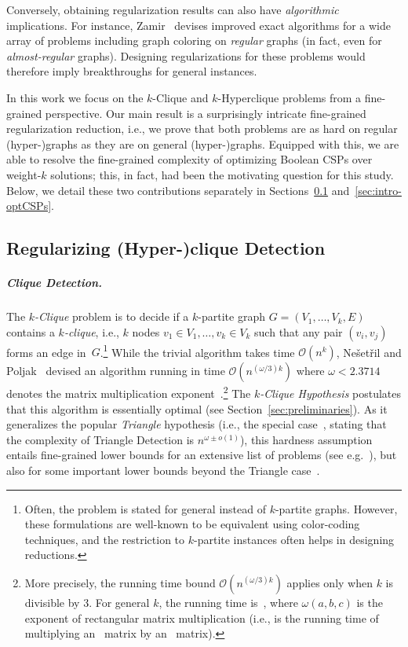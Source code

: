 \documentclass[a4paper,UKenglish,cleveref, autoref, thm-restate,numberwithinsect]{lipics-v2021}
\newcommand{\bigO}{\mathcal{O}}
\begin{document}
Conversely, obtaining regularization results can also have \emph{algorithmic} implications. For instance, Zamir~\cite{Zamir23} devises improved exact algorithms for a wide array of problems including graph coloring on \emph{regular} graphs (in fact, even for \emph{almost-regular} graphs). Designing regularizations for these problems would therefore imply breakthroughs for general instances.

In this work we focus on the $k$-Clique and $k$-Hyperclique problems from a fine-grained perspective. Our main result is a surprisingly intricate fine-grained regularization reduction, i.e., we prove that both problems are as hard on regular (hyper-)graphs as they are on general (hyper-)graphs. Equipped with this, we are able to resolve the fine-grained complexity of optimizing Boolean CSPs over weight-$k$ solutions; this, in fact, had been the motivating question for this study. Below, we detail these two contributions separately in Sections~\ref{sec:intro-hyperclique} and~\ref{sec:intro-optCSPs}. 

\subsection{Regularizing (Hyper-)clique Detection}
\label{sec:intro-hyperclique}
\subparagraph*{Clique Detection.}
The \emph{$k$-Clique} problem is to decide if a $k$-partite graph $G = (V_1, \dots, V_k, E)$ contains a \emph{$k$-clique}, i.e., $k$ nodes $v_1 \in V_1, \dots, v_k \in V_k$ such that any pair $(v_i, v_j)$ forms an edge in~$G$.\footnote{Often, the problem is stated for general instead of $k$-partite graphs. However, these formulations are well-known to be equivalent using color-coding techniques, and the restriction to $k$-partite instances often helps in designing reductions.} While the trivial algorithm takes time $\bigO(n^k)$, Ne\v{s}et\v{r}il and Poljak~\cite{NesetrilP85} devised an algorithm running in time $\bigO(n^{(\omega/3) k})$ where $\omega < 2.3714$ denotes the matrix multiplication exponent~\cite{AlmanDWXXZ25}.\footnote{More precisely, the running time bound $\bigO(n^{(\omega/3) k})$ applies only when $k$ is divisible by $3$. For general $k$, the running time is~\smash{$\bigO(n^{\omega(\lfloor k/3 \rfloor, \lceil k/3 \rceil, \lceil (k-1)/3\rceil)})$}, where $\omega(a, b, c)$ is the exponent of rectangular matrix multiplication (i.e., \smash{$\bigO(n^{\omega(a, b, c)})$} is the running time of multiplying an~ matrix by an~ matrix).} The \emph{$k$-Clique Hypothesis} postulates that this algorithm is essentially optimal (see Section~\ref{sec:preliminaries}). As it generalizes the popular \emph{Triangle} hypothesis (i.e., the special case~, stating that the complexity of Triangle Detection is $n^{\omega\pm o(1)}$), this hardness assumption entails fine-grained lower bounds for an extensive list of problems (see e.g.~\cite{Vassilevska18}), but also for some important lower bounds beyond the Triangle case~\cite{AbboudBW15a,Chang16,BringmannW17}.
\end{document}
